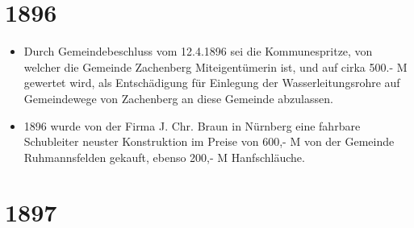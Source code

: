 \documentclass[12pt,a4paper]{book}
\begin{document}
\section*{1896}

\begin{itemize}
\item Durch Gemeindebeschluss vom 12.4.1896 sei die Kommunespritze, von
welcher die Gemeinde Zachenberg Miteigentümerin ist, und auf cirka 500.-
M gewertet wird, als Entschädigung für Einlegung der Wasserleitungsrohre
auf Gemeindewege von Zachenberg an diese Gemeinde abzulassen.

\item 1896 wurde von der Firma J. Chr. Braun in Nürnberg eine fahrbare
Schubleiter neuster Konstruktion im Preise von 600,- M von der Gemeinde
Ruhmannsfelden gekauft, ebenso 200,- M Hanfschläuche.
\end{itemize}

\section*{1897}
\end{document}
